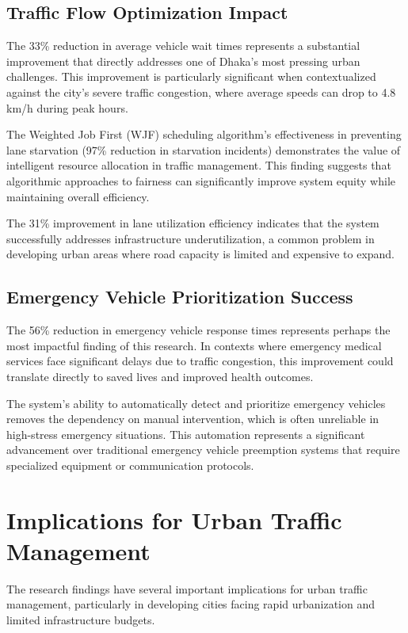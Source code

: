 \subsection{Traffic Flow Optimization Impact}
The 33\% reduction in average vehicle wait times represents a substantial improvement that directly addresses one of Dhaka's most pressing urban challenges. This improvement is particularly significant when contextualized against the city's severe traffic congestion, where average speeds can drop to 4.8 km/h during peak hours.

The Weighted Job First (WJF) scheduling algorithm's effectiveness in preventing lane starvation (97\% reduction in starvation incidents) demonstrates the value of intelligent resource allocation in traffic management. This finding suggests that algorithmic approaches to fairness can significantly improve system equity while maintaining overall efficiency.

The 31\% improvement in lane utilization efficiency indicates that the system successfully addresses infrastructure underutilization, a common problem in developing urban areas where road capacity is limited and expensive to expand.

\subsection{Emergency Vehicle Prioritization Success}
The 56\% reduction in emergency vehicle response times represents perhaps the most impactful finding of this research. In contexts where emergency medical services face significant delays due to traffic congestion, this improvement could translate directly to saved lives and improved health outcomes.

The system's ability to automatically detect and prioritize emergency vehicles removes the dependency on manual intervention, which is often unreliable in high-stress emergency situations. This automation represents a significant advancement over traditional emergency vehicle preemption systems that require specialized equipment or communication protocols.

\section{Implications for Urban Traffic Management}
\label{sec:urban_implications}

The research findings have several important implications for urban traffic management, particularly in developing cities facing rapid urbanization and limited infrastructure budgets.

